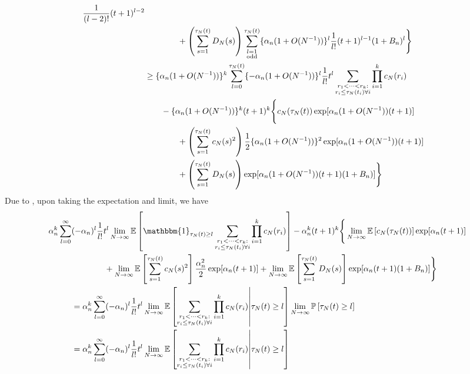\documentclass{article}
\newcommand{\Prob}{\mathbb{P}}
\newcommand{\E}{\mathbb{E}}
\newcommand{\1}[1]{\mathbbm{1}_{#1}}
\begin{document}
\begin{align}
\frac{1}{(l-2)!} (t+1)^{l-2} \notag\\
&\qquad\qquad+ \left( \sum_{s=1}^{\tau_N(t)} D_N(s) \right)
\sum_{\substack{ l=1 \\ \text{odd} }}^{\tau_N(t)} \{ \alpha_n (1 + O(N^{-1}) ) \}^l \frac{1}{l!} (t+1)^{l-1}
(1 + B_n)^l \Bigg\} \notag\\
&\geq \{ \alpha_n (1 + O(N^{-1}) ) \}^k
\sum_{l=0}^{\tau_N(t)} \{ - \alpha_n (1 + O(N^{-1}) ) \}^l \frac{1}{l!} t^l 
\sum_{\substack{r_1 <\dots< r_k :\\ r_i \leq \tau_N(t_i) \forall i}} \prod_{i=1}^k c_N(r_i) \notag\\
&\qquad- \{ \alpha_n (1 + O(N^{-1}) ) \}^k (t+1)^k
\Bigg\{ c_N(\tau_N(t)) \exp[ \alpha_n (1 + O(N^{-1}) ) (t+1) ] \notag\\
 &\qquad\qquad+  \left( \sum_{s=1}^{\tau_N(t)} c_N(s)^2 \right)
\frac{1}{2} \{ \alpha_n (1 + O(N^{-1}) ) \}^2 \exp[ \alpha_n (1 + O(N^{-1}) ) (t+1) ] \notag\\
&\qquad\qquad+ \left( \sum_{s=1}^{\tau_N(t)} D_N(s) \right)
\exp[ \alpha_n (1 + O(N^{-1}) ) (t+1) (1 + B_n) ] \Bigg\}
\end{align}
Due to \citet[Equations (3)--(5)]{brown2020}, upon taking the expectation and limit, we have
\begin{align}
\alpha_n^k \sum_{l=0}^{\infty} &(-\alpha_n)^l \frac{1}{l!} t^l 
\lim_{N\to\infty}\E \left[ \1{\tau_N(t) \geq l}
\sum_{\substack{r_1 <\dots< r_k :\\ r_i \leq \tau_N(t_i) \forall i}} \prod_{i=1}^k c_N(r_i) \right] 
- \alpha_n^k (t+1)^k
\Bigg\{ \lim_{N\to\infty}\E\left[c_N(\tau_N(t)) \right] \exp[ \alpha_n (t+1) ] \notag\\
 &\qquad\qquad+  \lim_{N\to\infty}\E\left[ \sum_{s=1}^{\tau_N(t)} c_N(s)^2 \right]
\frac{\alpha_n^2}{2} \exp[ \alpha_n (t+1) ]
+ \lim_{N\to\infty}\E\left[ \sum_{s=1}^{\tau_N(t)} D_N(s) \right]
\exp[ \alpha_n (t+1) (1 + B_n) ] \Bigg\} \notag\\
&= \alpha_n^k \sum_{l=0}^{\infty} (-\alpha_n)^l \frac{1}{l!} t^l 
\lim_{N\to\infty}\E \left[ \sum_{\substack{r_1 <\dots< r_k :\\ r_i \leq \tau_N(t_i) \forall i}} \prod_{i=1}^k c_N(r_i) \middle| \tau_N(t) \geq l \right] 
\lim_{N\to\infty}\Prob\left[ \tau_N(t) \geq l \right] \notag\\
&= \alpha_n^k \sum_{l=0}^{\infty} (-\alpha_n)^l \frac{1}{l!} t^l 
\lim_{N\to\infty}\E \left[ \sum_{\substack{r_1 <\dots< r_k :\\ r_i \leq \tau_N(t_i) \forall i}} \prod_{i=1}^k c_N(r_i) \middle| \tau_N(t) \geq l \right] 
\end{align}
\end{document}

